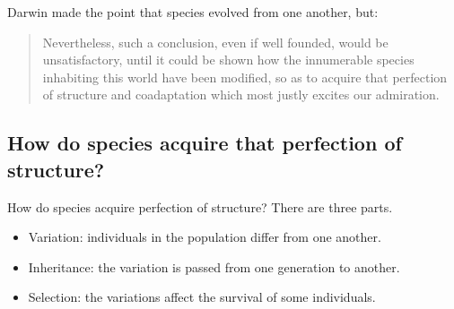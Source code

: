 \documentclass[]{article}
\begin{document}
Darwin made the point that species evolved from one another, but\cite{darwin1859origin}: \begin{quote}
	Nevertheless, such a conclusion, even if well founded, would be unsatisfactory, until it could be shown how the innumerable species inhabiting this world have been modified, so as to acquire that perfection of structure and coadaptation which most justly excites our admiration.
\end{quote}

\subsection{How do species acquire that perfection of structure?}
How do species acquire perfection of structure? There are three parts.
\begin{itemize}
	\item Variation: individuals in the population differ from one another.
	\item Inheritance: the variation is passed from one generation to another.
	\item Selection: the variations affect the survival of some individuals.
\end{itemize}
\end{document}
